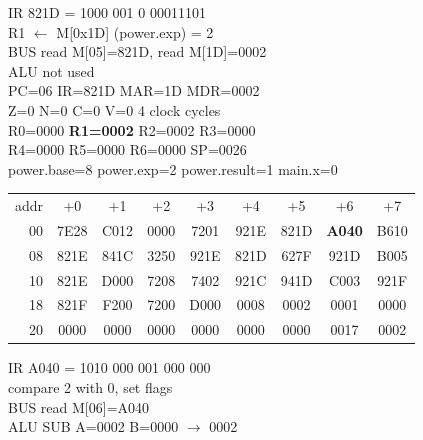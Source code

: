 \noindent\begin{tcolorbox}[stepbox, title={Step 10 \hfill PC 05 \quad LD R1, power.exp}]
\textcolor{dim}{IR} 821D = 1000 001 0 00011101\\
R1 $\leftarrow$ M[0x1D] (power.exp) = 2\\
\textcolor{dim}{BUS} read M[05]=821D, read M[1D]=0002\\
\textcolor{dim}{ALU} \textcolor{dim}{not used}\\
PC=06 IR=821D MAR=1D MDR=0002\\
Z=0 N=0 C=0 V=0 \hfill \textcolor{dim}{4 clock cycles}\\
R0=0000 \textcolor{wrt}{\textbf{R1=0002}} R2=0002 R3=0000\\
R4=0000 R5=0000 R6=0000 SP=0026\\
\textcolor{dim}{power.base=8  power.exp=2  power.result=1  main.x=0}\\[1pt]
{\setlength{\tabcolsep}{1.6pt}\begin{tabular}{@{}r*{8}{c}@{}}
\textcolor{dim}{addr} & \textcolor{dim}{+0} & \textcolor{dim}{+1} & \textcolor{dim}{+2} & \textcolor{dim}{+3} & \textcolor{dim}{+4} & \textcolor{dim}{+5} & \textcolor{dim}{+6} & \textcolor{dim}{+7}\\
\textcolor{dim}{00} & 7E28 & C012 & 0000 & 7201 & 921E & 821D & \cellcolor{pcc}\textbf{A040} & B610\\
\textcolor{dim}{08} & 821E & 841C & 3250 & 921E & 821D & 627F & 921D & B005\\
\textcolor{dim}{10} & 821E & D000 & 7208 & 7402 & 921C & 941D & C003 & 921F\\
\textcolor{dim}{18} & 821F & F200 & 7200 & D000 & \cellcolor{datac}0008 & \cellcolor{datac}0002 & \cellcolor{datac}0001 & \cellcolor{datac}0000\\
\textcolor{dim}{20} & \cellcolor{stackc}0000 & \cellcolor{stackc}0000 & \cellcolor{stackc}0000 & \cellcolor{stackc}0000 & \cellcolor{stackc}0000 & \cellcolor{stackc}0000 & \cellcolor{stackc}0017 & \cellcolor{stackc}0002\\
\end{tabular}}
\end{tcolorbox}\hfill\begin{tcolorbox}[stepbox, title={Step 11 \hfill PC 06 \quad CMP R1, R0}]
\textcolor{dim}{IR} A040 = 1010 000 001 000 000\\
compare 2 with 0, set flags\\
\textcolor{dim}{BUS} read M[06]=A040\\
\textcolor{dim}{ALU} SUB A=0002 B=0000 $\rightarrow$ 0002\\

\end{tcolorbox}
